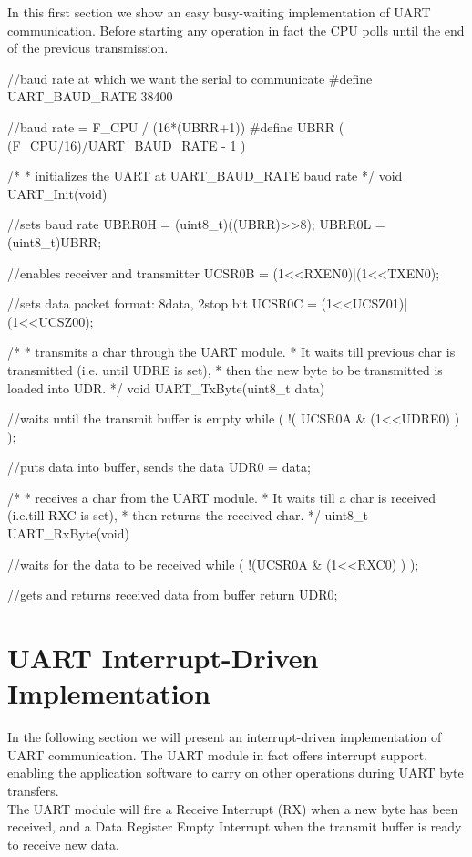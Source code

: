 In this first section we show an easy busy-waiting implementation of UART communication. Before starting any operation in fact the CPU polls until the end of the previous transmission.
\begin{ccode}
	//baud rate at which we want the serial to communicate
	#define UART_BAUD_RATE 38400

	//baud rate = F_CPU / (16*(UBRR+1))
	#define UBRR ( (F_CPU/16)/UART_BAUD_RATE - 1 )

	/*
	 * initializes the UART at UART_BAUD_RATE baud rate
	 */
	void UART_Init(void){
		//sets baud rate
		UBRR0H = (uint8_t)((UBRR)>>8);
		UBRR0L = (uint8_t)UBRR;
	
		//enables receiver and transmitter
		UCSR0B = (1<<RXEN0)|(1<<TXEN0);
	
		//sets data packet format: 8data, 2stop bit
		UCSR0C = (1<<UCSZ01)|(1<<UCSZ00);
	}

	/*
	 * transmits a char through the UART module.
	 *		It waits till previous char is transmitted (i.e. until UDRE is set),
	 *		then the new byte to be transmitted is loaded into UDR.
	 */
	void UART_TxByte(uint8_t data) {
		//waits until the transmit buffer is empty
		while ( !( UCSR0A & (1<<UDRE0) ) );
	
		//puts data into buffer, sends the data
		UDR0 = data;
	}

	/*
	 * receives a char from the UART module.
	 *		It waits till a char is received (i.e.till RXC is set),
	 *		then returns the received char.
	 */
	uint8_t UART_RxByte(void) {
		//waits for the data to be received
		while ( !(UCSR0A & (1<<RXC0) ) );
	
		//gets and returns received data from buffer
		return UDR0;
	}
\end{ccode}


\section{UART Interrupt-Driven Implementation}

In the following section we will present an interrupt-driven implementation of UART communication. The UART module in fact offers interrupt support, enabling the application software to carry on other operations during UART byte transfers.\\

The UART module will fire a Receive Interrupt (RX) when a new byte has been received, and a Data Register Empty Interrupt when the transmit buffer is ready to receive new data.

